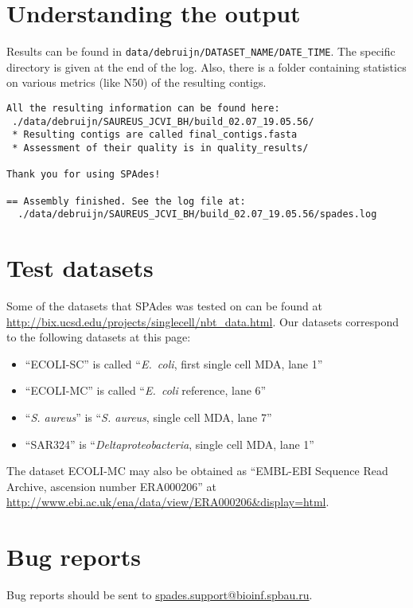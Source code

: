 \documentclass{article}
\def\spades{SPAdes}
\def\ecoli{\it E.~coli}
\begin{document}
\section{Understanding the output}
Results can be found in {\tt data/debruijn/DATASET\_NAME/DATE\_TIME}.
The specific directory is given at the end of the log.
Also, there is a folder containing statistics on various metrics (like N50) of the resulting contigs.
\begin{lstlisting}
All the resulting information can be found here: 
 ./data/debruijn/SAUREUS_JCVI_BH/build_02.07_19.05.56/
 * Resulting contigs are called final_contigs.fasta
 * Assessment of their quality is in quality_results/

Thank you for using SPAdes!

== Assembly finished. See the log file at: 
  ./data/debruijn/SAUREUS_JCVI_BH/build_02.07_19.05.56/spades.log
\end{lstlisting}


\section{Test datasets}\label{sec:testdatasets}
Some of the datasets that {\spades} was tested on can be found at
\url{http://bix.ucsd.edu/projects/singlecell/nbt_data.html}.
Our datasets correspond to the following datasets at this page:
\begin{itemize}
\item ``ECOLI-SC'' is called ``{\ecoli}, first single cell MDA, lane 1''
\item ``ECOLI-MC'' is called ``{\ecoli} reference, lane 6''
\item ``{\it S. aureus}'' is ``{\it S. aureus}, single cell MDA, lane 7''
\item ``SAR324'' is ``{\it Deltaproteobacteria}, single cell MDA, lane 1''
\end{itemize}
The dataset ECOLI-MC may also be obtained as
``EMBL-EBI Sequence Read Archive, ascension number ERA000206''
at \url{http://www.ebi.ac.uk/ena/data/view/ERA000206&display=html}.

\section{Bug reports}
Bug reports should be sent to \url{spades.support@bioinf.spbau.ru}.






\end{document}
